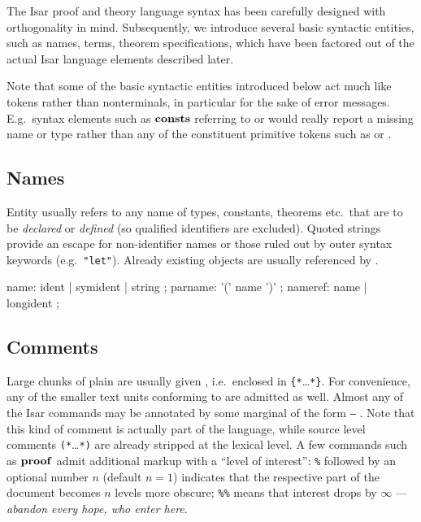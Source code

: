 The Isar proof and theory language syntax has been carefully designed with
orthogonality in mind.  Subsequently, we introduce several basic syntactic
entities, such as names, terms, theorem specifications, which have been
factored out of the actual Isar language elements described later.

Note that some of the basic syntactic entities introduced below act much like
tokens rather than nonterminals, in particular for the sake of error messages.
E.g.\ syntax elements such as ${\mathord{\mathbf{consts}}}$ referring to  or
 would really report a missing name or type rather than any
of the constituent primitive tokens such as  or
.


\subsection{Names}

Entity  usually refers to any name of types, constants,
theorems etc.\ that are to be \emph{declared} or \emph{defined} (so qualified
identifiers are excluded).  Quoted strings provide an escape for
non-identifier names or those ruled out by outer syntax keywords (e.g.\ 
\verb|"let"|).  Already existing objects are usually referenced by
\railqtoken{nameref}.

\begin{rail}
  name: ident | symident | string
  ;
  parname: '(' name ')'
  ;
  nameref: name | longident
  ;
\end{rail}


\subsection{Comments}\label{sec:comments}

Large chunks of plain  are usually given
, i.e.\ enclosed in \verb|{*|\dots\verb|*}|.  For
convenience, any of the smaller text units conforming to 
are admitted as well.  Almost any of the Isar commands may be annotated by
some marginal \railnonterm{comment} of the form \texttt{--} .
Note that this kind of comment is actually part of the language, while source
level comments \verb|(*|\dots\verb|*)| are already stripped at the lexical
level.  A few commands such as ${\mathord{\mathbf{proof}}}$ admit additional markup with a
``level of interest'': \texttt{\%} followed by an optional number $n$ (default
$n = 1$) indicates that the respective part of the document becomes $n$ levels
more obscure; \texttt{\%\%} means that interest drops by $\infty$ ---
\emph{abandon every hope, who enter here}.

